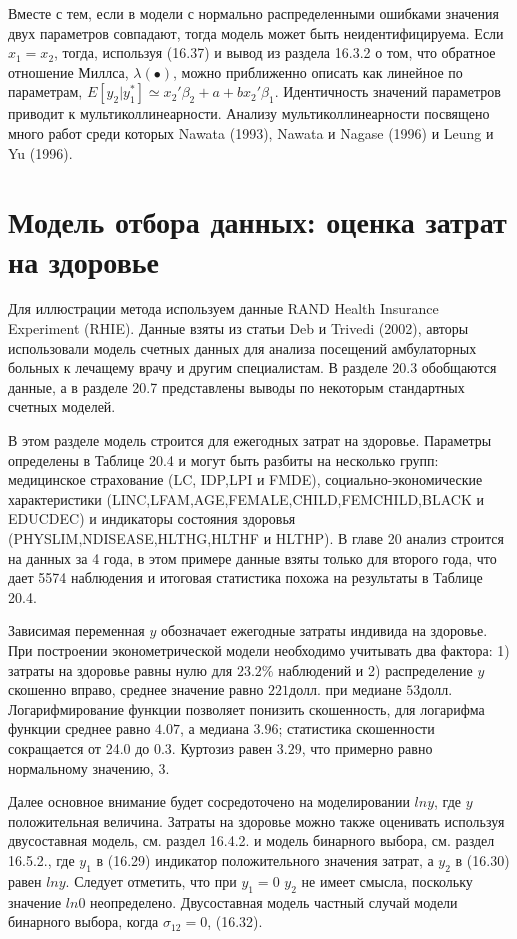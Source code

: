 Вместе с тем, если в модели с нормально распределенными ошибками значения двух параметров совпадают, тогда модель может быть неидентифицируема. Если $x_1=x_2$, тогда, используя (16.37) и  вывод из раздела 16.3.2 о том, что обратное отношение Миллса, $\lambda(\bullet)$, можно приближенно описать как линейное по параметрам, $E[y_2|y_1^{*}]{\simeq}x_2'\beta_2+a+bx_2'\beta_1$. Идентичность значений параметров приводит к мультиколлинеарности. Анализу мультиколлинеарности посвящено много работ среди которых Nawata (1993), Nawata и Nagase (1996) и Leung и Yu (1996). 


\section{Модель отбора данных: оценка затрат на здоровье}

Для иллюстрации метода используем данные RAND Health Insurance Experiment (RHIE). Данные взяты из статьи Deb и Trivedi (2002), авторы использовали модель счетных данных для анализа посещений амбулаторных больных к лечащему врачу и другим специалистам. В разделе 20.3 обобщаются данные, а в разделе 20.7 представлены выводы по некоторым стандартных счетных моделей.


В этом разделе модель строится для ежегодных затрат на здоровье. Параметры определены в Таблице 20.4 и могут быть разбиты на несколько групп: медицинское страхование (LC, IDP,LPI и FMDE), социально-экономические характеристики (LINC,LFAM,AGE,FEMALE,CHILD,FEMCHILD,BLACK и EDUCDEC) и индикаторы состояния здоровья (PHYSLIM,NDISEASE,HLTHG,HLTHF и HLTHP). В главе 20 анализ строится на данных за 4 года, в этом примере данные взяты только для второго года, что дает 5574 наблюдения и итоговая статистика похожа на результаты в Таблице 20.4.

Зависимая переменная $y$ обозначает ежегодные затраты индивида на здоровье. При построении эконометрической модели необходимо учитывать два фактора: 1) затраты на здоровье равны нулю для $23.2\%$ наблюдений и 2) распределение $y$ скошенно вправо, среднее значение равно $221 $долл. при медиане $53 $долл. Логарифмирование функции позволяет понизить скошенность, для логарифма функции среднее равно $4.07$, а медиана $3.96$; статистика скошенности сокращается от 24.0 до 0.3. Куртозиз равен $3.29$, что примерно равно нормальному значению, $3$. 

Далее основное внимание будет сосредоточено на моделировании $ln{y}$, где $y$ положительная величина.  Затраты на здоровье можно также оценивать используя двусоставная модель, см. раздел 16.4.2. и модель бинарного выбора, см. раздел 16.5.2., где $y_1$ в (16.29) индикатор положительного значения затрат, а $y_2$ в (16.30) равен $ln{y}$. Следует отметить, что при $y_1=0$ $y_2$ не имеет смысла, поскольку значение $ln{0}$ неопределено. Двусоставная модель частный случай модели бинарного выбора, когда $\sigma_{12}=0$, (16.32).

